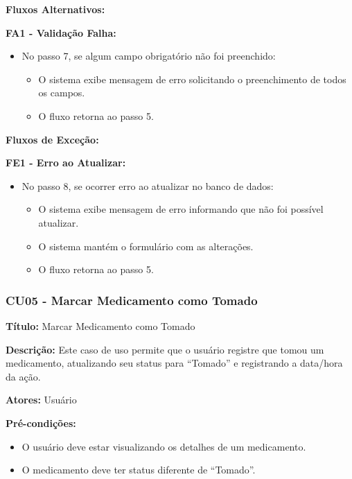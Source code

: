 \documentclass[12pt]{article}
\begin{document}
\textbf{Fluxos Alternativos:}

\textbf{FA1 - Validação Falha:}
\begin{itemize}
    \item No passo 7, se algum campo obrigatório não foi preenchido:
    \begin{itemize}
        \item O sistema exibe mensagem de erro solicitando o preenchimento de todos os campos.
        \item O fluxo retorna ao passo 5.
    \end{itemize}
\end{itemize}

\textbf{Fluxos de Exceção:}

\textbf{FE1 - Erro ao Atualizar:}
\begin{itemize}
    \item No passo 8, se ocorrer erro ao atualizar no banco de dados:
    \begin{itemize}
        \item O sistema exibe mensagem de erro informando que não foi possível atualizar.
        \item O sistema mantém o formulário com as alterações.
        \item O fluxo retorna ao passo 5.
    \end{itemize}
\end{itemize}

\subsubsection{CU05 - Marcar Medicamento como Tomado}

\textbf{Título:} Marcar Medicamento como Tomado

\textbf{Descrição:} Este caso de uso permite que o usuário registre que tomou um medicamento, atualizando seu status para ``Tomado'' e registrando a data/hora da ação.

\textbf{Atores:} Usuário

\textbf{Pré-condições:}
\begin{itemize}
    \item O usuário deve estar visualizando os detalhes de um medicamento.
    \item O medicamento deve ter status diferente de ``Tomado''.
\end{itemize}
\end{document}
